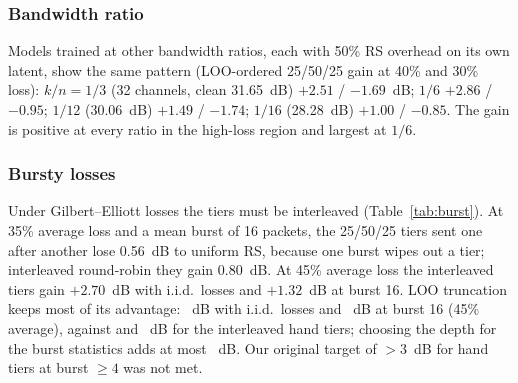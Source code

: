 \documentclass[journal]{IEEEtran}
\begin{document}
\subsubsection{Bandwidth ratio}
Models trained at other bandwidth ratios, each with 50\% RS overhead on its own latent, show the same
pattern (LOO-ordered 25/50/25 gain at 40\% and 30\% loss): $k/n=1/3$ (32 channels, clean 31.65~dB)
$+2.51$ / $-1.69$~dB; $1/6$ $+2.86$ / $-0.95$; $1/12$ (30.06~dB) $+1.49$ / $-1.74$; $1/16$ (28.28~dB)
$+1.00$ / $-0.85$. The gain is positive at every ratio in the high-loss region and largest at $1/6$.

\subsubsection{Bursty losses}
Under Gilbert--Elliott losses the tiers must be interleaved (Table~\ref{tab:burst}). At 35\% average loss
and a mean burst of 16 packets, the 25/50/25 tiers sent one after another lose 0.56~dB to uniform RS,
because one burst wipes out a tier; interleaved round-robin they gain 0.80~dB. At 45\% average loss the
interleaved tiers gain $+2.70$~dB with i.i.d.\ losses and $+1.32$~dB at burst 16. LOO truncation keeps
most of its advantage: \BurstTruncGainOne~dB with i.i.d.\ losses and \BurstTruncGainSixteen~dB at burst 16
(45\% average), against \BurstHandGainOne{} and \BurstHandGainSixteen~dB for the interleaved hand tiers;
choosing the depth for the burst statistics adds at most \BurstDepthGainMax~dB. Our original target of
$>3$~dB for hand tiers at burst $\ge4$ was not met.

\begin{table}[t]\centering\caption{Gilbert--Elliott bursts: gain over uniform RS (dB), primary image model, LOO order}\label{tab:burst}
\end{table}
\end{document}
